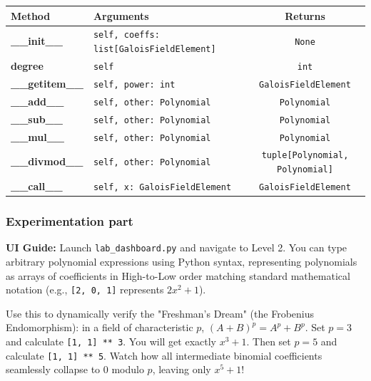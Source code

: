 \begin{center}
\renewcommand{\arraystretch}{1.5}
\begin{tabularx}{\textwidth}{@{} >{\bfseries}l X c @{}}
\toprule
Method & Arguments & Returns \\ \midrule
\_\_init\_\_ & \lstinline|self, coeffs: list[GaloisFieldElement]| & \lstinline|None| \\
degree & \lstinline|self| & \lstinline|int| \\
\_\_getitem\_\_ & \lstinline|self, power: int| & \lstinline|GaloisFieldElement| \\
\_\_add\_\_ & \lstinline|self, other: Polynomial| & \lstinline|Polynomial| \\
\_\_sub\_\_ & \lstinline|self, other: Polynomial| & \lstinline|Polynomial| \\
\_\_mul\_\_ & \lstinline|self, other: Polynomial| & \lstinline|Polynomial| \\
\_\_divmod\_\_ & \lstinline|self, other: Polynomial| & \lstinline|tuple[Polynomial, Polynomial]| \\
\_\_call\_\_ & \lstinline|self, x: GaloisFieldElement| & \lstinline|GaloisFieldElement| \\
\bottomrule
\end{tabularx}
\end{center}

\subsubsection*{Experimentation part}
\textbf{UI Guide:} Launch \lstinline|lab_dashboard.py| and navigate to Level 2. 
You can type arbitrary polynomial expressions using Python syntax, representing polynomials as arrays of coefficients in High-to-Low order matching standard mathematical notation (e.g., \lstinline|[2, 0, 1]| represents $2x^2 + 1$). 

Use this to dynamically verify the "Freshman's Dream" (the Frobenius Endomorphism): in a field of characteristic $p$, $(A+B)^p = A^p + B^p$. 
Set $p=3$ and calculate \lstinline|[1, 1] ** 3|. You will get exactly $x^3+1$. 
Then set $p=5$ and calculate \lstinline|[1, 1] ** 5|. Watch how all intermediate binomial coefficients seamlessly collapse to $0$ modulo $p$, leaving only $x^5+1$!
